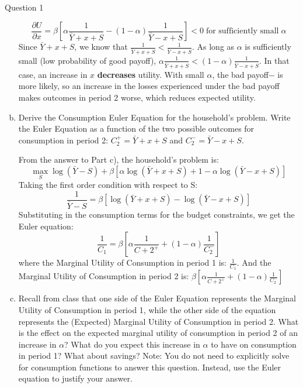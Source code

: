 \documentclass[a4paper]{article}
\newif\IfInSansMode
\begin{document}
\begin{questionbox}{Question 1}
\begin{enumerate}[(a)]
\begin{explanationbox}
				\[
					\frac{\partial U}{\partial x} = \beta \left[ \alpha\frac{1}{\bar{Y} + x + S} - (1-\alpha)\frac{1}{\bar{Y} - x + S} \right] < 0 \;\text{for sufficiently small}\; \alpha
				\]
				Since \( \bar{Y} + x + S \), we know that \( \frac{1}{\bar{Y} + x + S} < \frac{1}{\bar{Y} - x + S} \). As long as \( \alpha \) is suﬃciently small (low probability of good payoﬀ), \( \alpha\frac{1}{\bar{Y} + x + S} < (1-\alpha)\frac{1}{\bar{Y} - x + S} \). In that case, an increase in \( x \) \textbf{decreases} utility. With small \( \alpha \), the bad payoﬀ− is more likely, so an increase in the losses experienced under the bad payoﬀ makes outcomes in period 2 worse, which reduces expected utility.
			\end{explanationbox}
			\item Derive the Consumption Euler Equation for the household's problem. Write the Euler Equation as a function of the two possible outcomes for consumption in period 2: \( C_2^+ = \bar{Y} + x + S \) and \( C_2^- = \bar{Y} - x + S \).
			\begin{explanationbox}
				From the answer to Part c), the household’s problem is:
				\[
					\max_S \log (\bar{Y}- S) + \beta \left[ \alpha\log(\bar{Y} + x + S) + 1-\alpha \log(\bar{Y} - x + S) \right]
				\]
				Taking the ﬁrst order condition with respect to S:
				\[
					\frac{1}{\bar{Y}-S} = \beta\left[ \log(\bar{Y} + x + S) - \log(\bar{Y} - x + S) \right]
				\]
				Substituting in the consumption terms for the budget constraints, we get the Euler equation:
				\[
					\frac{1}{C_1} = \beta \left[ \alpha\frac{1}{C+2^+} + (1-\alpha) \frac{1}{C_2^-} \right]
				\]
				where the Marginal Utility of Consumption in period 1 is: \( \frac{1}{C_1} \). And the Marginal Utility of Consumption in period 2 is: \( \beta \left[ \alpha\frac{1}{C+2^+} + (1-\alpha) \frac{1}{C_2^-} \right] \)
			\end{explanationbox}\pagebreak
			\item Recall from class that one side of the Euler Equation represents the Marginal Utility of Consumption in period 1, while the other side of the equation represents the (Expected) Marginal Utility of Consumption in period 2. What is the eﬀect on the expected marginal utility of consumption in period 2 of an increase in \( \alpha \)? What do you expect this increase in \( \alpha \) to have on consumption in period 1? What about savings? Note: You do not need to explicitly solve for consumption functions to answer this question. Instead, use the Euler equation to justify your answer.
			\begin{explanationbox}

\end{explanationbox}
\end{enumerate}
\end{questionbox}
\end{document}

